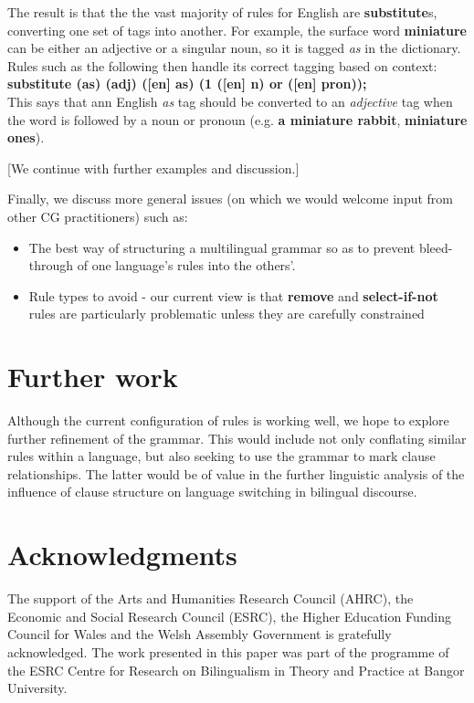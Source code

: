 \documentclass[11pt]{article}
\begin{document}
The result is that the the vast majority of rules for English are \textbf{substitute}s, converting one set of tags into another.  For example, the surface word \textbf{miniature} can be either an adjective or a singular noun, so it is tagged \textit{as} in the dictionary.  Rules such as the following then handle its correct tagging based on context:\\
\indent\textbf{substitute (as) (adj) ([en] as) (1 ([en] n) or ([en] pron));}\\
This says that ann English \textit{as} tag should be converted to an \textit{adjective} tag when the word is followed by a noun or pronoun (e.g. \textbf{a miniature rabbit}, \textbf{miniature ones}).

[We continue with further examples and discussion.]

Finally, we discuss more general issues (on which we would welcome input from other CG practitioners) such as:
\begin{itemize}
\item The best way of structuring a multilingual grammar so as to prevent bleed-through of one language's rules into the others'.
\item Rule types to avoid - our current view is that \textbf{remove} and \textbf{select-if-not} rules are particularly problematic unless they are carefully constrained
\end{itemize}

\section{Further work}
\label{sec:further}

Although the current configuration of rules is working well, we hope to explore further refinement of the grammar.  This would include not only conflating similar rules within a language, but also seeking to use the grammar to mark clause relationships.  The latter would be of value in the further linguistic analysis of the influence of clause structure on language switching in bilingual discourse.


\section*{Acknowledgments}

The support of the Arts and Humanities Research Council (AHRC), the Economic and Social Research Council (ESRC), the Higher Education Funding Council for Wales and the Welsh Assembly Government is gratefully acknowledged. The work presented in this paper was part of the programme of the ESRC Centre for Research on Bilingualism in Theory and Practice at Bangor University.




\end{document}
